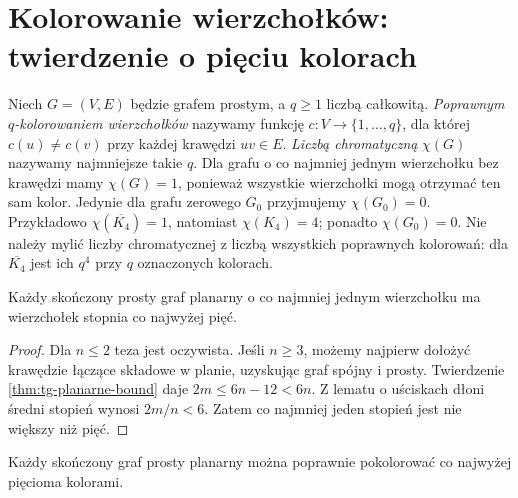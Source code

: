 \section{Kolorowanie wierzchołków: twierdzenie o pięciu kolorach}
\label{sec:tg-five-color}

\begin{definicja}
Niech $G=(V,E)$ będzie grafem prostym, a $q\ge1$ liczbą całkowitą.
\emph{Poprawnym $q$-kolorowaniem wierzchołków} nazywamy
funkcję $c:V\to\{1,\ldots,q\}$, dla której
$c(u)\ne c(v)$ przy każdej krawędzi $uv\in E$.
\emph{Liczbą chromatyczną} $\chi(G)$ nazywamy najmniejsze
takie $q$. Dla grafu o co najmniej jednym wierzchołku
bez krawędzi mamy $\chi(G)=1$, ponieważ wszystkie
wierzchołki mogą otrzymać ten sam kolor.
Jedynie dla grafu zerowego $G_0$ przyjmujemy $\chi(G_0)=0$.
Przykładowo $\chi(\overline{K_4})=1$, natomiast
$\chi(K_4)=4$; ponadto $\chi(G_0)=0$.
Nie należy mylić liczby chromatycznej z liczbą wszystkich
poprawnych kolorowań: dla $\overline{K_4}$ jest ich $q^4$
przy $q$ oznaczonych kolorach.
\end{definicja}

\begin{lemat}
Każdy skończony prosty graf planarny o co najmniej jednym
wierzchołku ma wierzchołek stopnia co najwyżej pięć.
\end{lemat}

\begin{proof}
Dla $n\le2$ teza jest oczywista. Jeśli $n\ge3$, możemy
najpierw dołożyć krawędzie łączące składowe w planie,
uzyskując graf spójny i prosty. Twierdzenie
\ref{thm:tg-planarne-bound} daje $2m\le6n-12<6n$.
Z lematu o uściskach dłoni średni stopień wynosi $2m/n<6$.
Zatem co najmniej jeden stopień jest nie większy niż pięć.
\end{proof}

\begin{twierdzenie}
\label{thm:tg-5color}
Każdy skończony graf prosty planarny można poprawnie
pokolorować co najwyżej pięcioma kolorami.
\end{twierdzenie}

